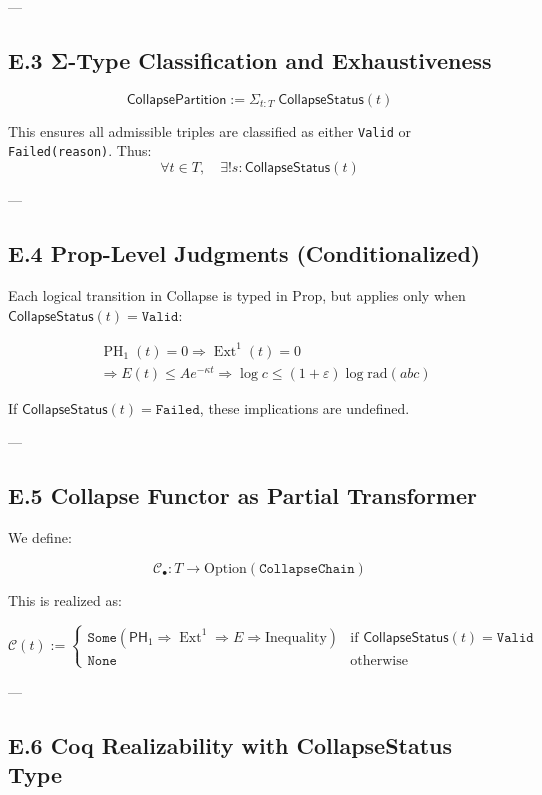 \documentclass[11pt]{article}
\DeclareMathOperator{\Ext}{Ext}
\DeclareMathOperator{\PH}{PH}
\begin{document}
---

\subsection*{E.3 Σ-Type Classification and Exhaustiveness}

\[
\mathsf{CollapsePartition} := \Sigma_{t:T} \; \mathsf{CollapseStatus}(t)
\]

This ensures all admissible triples are classified as either \texttt{Valid} or \texttt{Failed(reason)}.  
Thus:
\[
\forall t \in T, \quad \exists! s : \mathsf{CollapseStatus}(t)
\]

---

\subsection*{E.4 Prop-Level Judgments (Conditionalized)}

Each logical transition in Collapse is typed in Prop, but applies only when \( \mathsf{CollapseStatus}(t) = \texttt{Valid} \):

\[
\begin{aligned}
& \PH_1(t) = 0 \Rightarrow \Ext^1(t) = 0 \\
& \Rightarrow E(t) \leq Ae^{-\kappa t} \Rightarrow \log c \leq (1+\varepsilon) \log \mathrm{rad}(abc)
\end{aligned}
\]

If \( \mathsf{CollapseStatus}(t) = \texttt{Failed} \), these implications are undefined.

---

\subsection*{E.5 Collapse Functor as Partial Transformer}

We define:

\[
\mathcal{C}_\bullet : T \to \mathrm{Option}(\texttt{CollapseChain})
\]

This is realized as:

\[
\mathcal{C}(t) := 
\begin{cases}
\texttt{Some}(\mathsf{PH}_1 \Rightarrow \Ext^1 \Rightarrow E \Rightarrow \text{Inequality}) & \text{if } \mathsf{CollapseStatus}(t) = \texttt{Valid} \\
\texttt{None} & \text{otherwise}
\end{cases}
\]

---

\subsection*{E.6 Coq Realizability with CollapseStatus Type}
\end{document}
